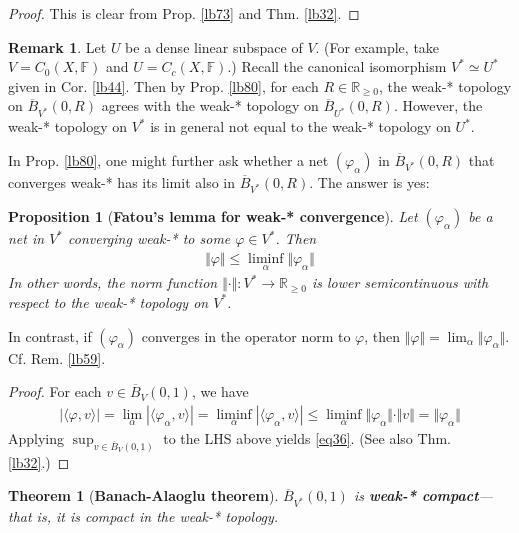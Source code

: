 \documentclass[12pt,b5paper,notitlepage]{article}
\theoremstyle{definition}
\newtheorem{rem}[df]{Remark}
\theoremstyle{plain}
\newtheorem{thm}[df]{Theorem}
\newtheorem{pp}[df]{Proposition}
\newcommand{\ovl}{\overline}
\newcommand{\bk}[1]{\langle {#1}\rangle}
\newcommand{\Rbb}{\mathbb R}
\newcommand{\Fbb}{\mathbb F}
\numberwithin{equation}{section}
\begin{document}
\begin{proof}
This is clear from Prop. \ref{lb73} and  Thm. \ref{lb32}.
\end{proof}


\begin{rem}\label{lb96}
Let $U$ be a dense linear subspace of $V$. (For example, take $V=C_0(X,\Fbb)$ and $U=C_c(X,\Fbb)$.) Recall the canonical isomorphism $V^*\simeq U^*$ given in Cor. \ref{lb44}. Then by Prop. \ref{lb80}, for each $R\in\Rbb_{\geq0}$, the weak-* topology on $\ovl B_{V^*}(0,R)$ agrees with the weak-* topology on $\ovl B_{U^*}(0,R)$. However, the weak-* topology on $V^*$ is in general not equal to the weak-* topology on $U^*$. 
\end{rem}



In Prop. \ref{lb80}, one might further ask whether a net $(\varphi_\alpha)$ in $\ovl B_{V^*}(0,R)$ that converges weak-* has its limit also in $\ovl B_{V^*}(0,R)$. The answer is yes:

\begin{pp}[\textbf{Fatou's lemma for weak-* convergence}]\label{lb106}
Let $(\varphi_\alpha)$ be a net in $V^*$ converging weak-* to some $\varphi\in V^*$. Then
\begin{align}\label{eq36}
\Vert\varphi\Vert\leq\liminf_\alpha\Vert\varphi_\alpha\Vert
\end{align}
In other words, the norm function $\Vert\cdot\Vert:V^*\rightarrow\Rbb_{\geq0}$ is lower semicontinuous with respect to the weak-* topology on $V^*$.
\end{pp}


In contrast, if $(\varphi_\alpha)$ converges in the operator norm to $\varphi$, then $\Vert\varphi\Vert=\lim_\alpha\Vert\varphi_\alpha\Vert$. Cf. Rem. \ref{lb59}.


\begin{proof}
For each $v\in\ovl B_V(0,1)$, we have
\begin{align*}
|\bk{\varphi,v}|=\lim_\alpha |\bk{\varphi_\alpha,v}|=\liminf_\alpha |\bk{\varphi_\alpha,v}|\leq\liminf_\alpha\Vert\varphi_\alpha\Vert\cdot\Vert v\Vert=\Vert\varphi_\alpha\Vert
\end{align*}
Applying $\sup_{v\in\ovl B_V(0,1)}$ to the LHS above yields \eqref{eq36}. (See also Thm. \ref{lb32}.)
\end{proof}



\begin{thm}[\textbf{Banach-Alaoglu theorem}]\label{lb60}
$\ovl B_{V^*}(0,1)$ is \textbf{weak-* compact}---that is, it is compact in the weak-* topology. 
\end{thm}
\end{document}
